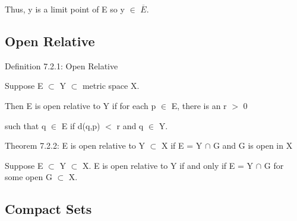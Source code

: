 	Thus, y is a limit point of E so y $\in$ $\overline{E}$.





\subsection{ Open Relative }

{ \color{blue} Definition 7.2.1: Open Relative }

	\begin{adjustbox}{minipage=14cm, right}
		Suppose E $\subset$ Y $\subset$ metric space X.

		Then E is open relative to Y if for each p $\in$ E, there is an
		r $>$ 0

		such that q $\in$ E if d(q,p) $<$ r and q $\in$ Y.
	\end{adjustbox}

{ \color{red} Theorem 7.2.2: E is open relative to Y $\subset$ X
if E = Y $\cap$ G and G is open in X} 

	\begin{adjustbox}{minipage=14cm, right}
		Suppose E $\subset$ Y $\subset$ X. E is open relative to Y if and
		only if E = Y $\cap$ G for some open G $\subset$ X.
	\end{adjustbox}




\subsection{ Compact Sets }




















\subsection{}    
